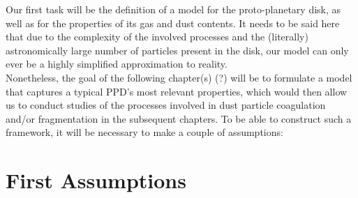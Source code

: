 Our first task will be the definition of a model for the proto-planetary disk, as well as for
the properties of its gas and dust contents. It needs to be said here that due to the complexity of
the involved processes and the (literally) astronomically large number of particles present in the 
disk, our model can only ever be a highly simplified approximation to reality. \\

Nonetheless, the goal of the following chapter(s) (?) will be to formulate a model that captures a 
typical PPD's most relevant properties, which would then allow us to conduct studies of the 
processes involved in dust particle coagulation and/or fragmentation in the subsequent chapters. 
To be able to construct such a framework, it will be necessary to make a couple of assumptions:


\section{First Assumptions}

